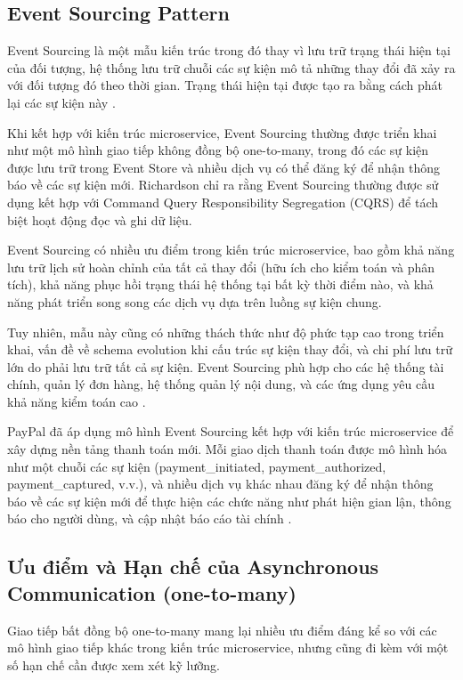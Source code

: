 \subsection{Event Sourcing Pattern}
Event Sourcing là một mẫu kiến trúc trong đó thay vì lưu trữ trạng thái hiện tại của đối tượng, hệ thống lưu trữ chuỗi các sự kiện mô tả những thay đổi đã xảy ra với đối tượng đó theo thời gian. Trạng thái hiện tại được tạo ra bằng cách phát lại các sự kiện này \cite{fowler2002}.

Khi kết hợp với kiến trúc microservice, Event Sourcing thường được triển khai như một mô hình giao tiếp không đồng bộ one-to-many, trong đó các sự kiện được lưu trữ trong Event Store và nhiều dịch vụ có thể đăng ký để nhận thông báo về các sự kiện mới. Richardson \cite{richardson2019} chỉ ra rằng Event Sourcing thường được sử dụng kết hợp với Command Query Responsibility Segregation (CQRS) để tách biệt hoạt động đọc và ghi dữ liệu.

Event Sourcing có nhiều ưu điểm trong kiến trúc microservice, bao gồm khả năng lưu trữ lịch sử hoàn chỉnh của tất cả thay đổi (hữu ích cho kiểm toán và phân tích), khả năng phục hồi trạng thái hệ thống tại bất kỳ thời điểm nào, và khả năng phát triển song song các dịch vụ dựa trên luồng sự kiện chung.

Tuy nhiên, mẫu này cũng có những thách thức như độ phức tạp cao trong triển khai, vấn đề về schema evolution khi cấu trúc sự kiện thay đổi, và chi phí lưu trữ lớn do phải lưu trữ tất cả sự kiện. Event Sourcing phù hợp cho các hệ thống tài chính, quản lý đơn hàng, hệ thống quản lý nội dung, và các ứng dụng yêu cầu khả năng kiểm toán cao \cite{richardson2019}.

PayPal đã áp dụng mô hình Event Sourcing kết hợp với kiến trúc microservice để xây dựng nền tảng thanh toán mới. Mỗi giao dịch thanh toán được mô hình hóa như một chuỗi các sự kiện (payment\_initiated, payment\_authorized, payment\_captured, v.v.), và nhiều dịch vụ khác nhau đăng ký để nhận thông báo về các sự kiện mới để thực hiện các chức năng như phát hiện gian lận, thông báo cho người dùng, và cập nhật báo cáo tài chính \cite{raman2016}.

\subsection{Ưu điểm và Hạn chế của Asynchronous Communication (one-to-many)}
Giao tiếp bất đồng bộ one-to-many mang lại nhiều ưu điểm đáng kể so với các mô hình giao tiếp khác trong kiến trúc microservice, nhưng cũng đi kèm với một số hạn chế cần được xem xét kỹ lưỡng.

